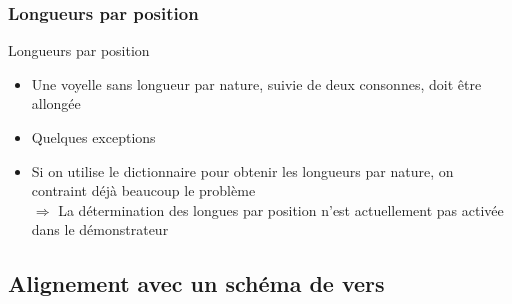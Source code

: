 \documentclass{beamer}
\begin{document}
\subsubsection{Longueurs par position}

\begin{frame}{Longueurs par position}

\begin{itemize}
\item Une voyelle sans longueur par nature, suivie de deux consonnes, doit être allongée
\item Quelques exceptions
\vfill
\item Si on utilise le dictionnaire pour obtenir les longueurs par nature, on contraint déjà beaucoup le problème\\
$\Rightarrow$ La détermination des longues par position n'est actuellement pas activée dans le démonstrateur
\end{itemize}
\end{frame} %


\subsection{Alignement avec un schéma de vers}
\end{document}
